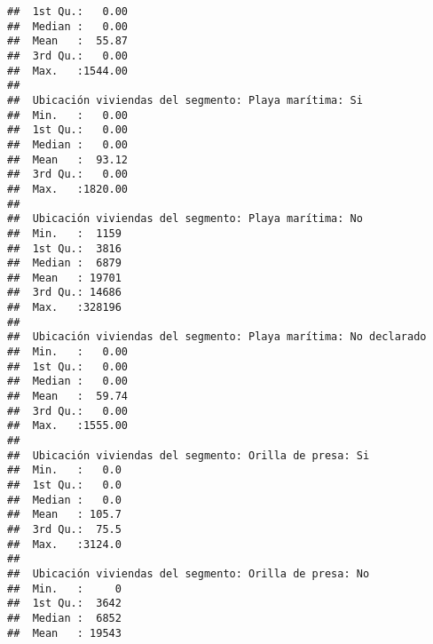 \documentclass[11pt,]{article}
\begin{document}
\begin{verbatim}
##  1st Qu.:   0.00                                               
##  Median :   0.00                                               
##  Mean   :  55.87                                               
##  3rd Qu.:   0.00                                               
##  Max.   :1544.00                                               
##                                                                
##  Ubicación viviendas del segmento: Playa marítima: Si
##  Min.   :   0.00                                     
##  1st Qu.:   0.00                                     
##  Median :   0.00                                     
##  Mean   :  93.12                                     
##  3rd Qu.:   0.00                                     
##  Max.   :1820.00                                     
##                                                      
##  Ubicación viviendas del segmento: Playa marítima: No
##  Min.   :  1159                                      
##  1st Qu.:  3816                                      
##  Median :  6879                                      
##  Mean   : 19701                                      
##  3rd Qu.: 14686                                      
##  Max.   :328196                                      
##                                                      
##  Ubicación viviendas del segmento: Playa marítima: No declarado
##  Min.   :   0.00                                               
##  1st Qu.:   0.00                                               
##  Median :   0.00                                               
##  Mean   :  59.74                                               
##  3rd Qu.:   0.00                                               
##  Max.   :1555.00                                               
##                                                                
##  Ubicación viviendas del segmento: Orilla de presa: Si
##  Min.   :   0.0                                       
##  1st Qu.:   0.0                                       
##  Median :   0.0                                       
##  Mean   : 105.7                                       
##  3rd Qu.:  75.5                                       
##  Max.   :3124.0                                       
##                                                       
##  Ubicación viviendas del segmento: Orilla de presa: No
##  Min.   :     0                                       
##  1st Qu.:  3642                                       
##  Median :  6852                                       
##  Mean   : 19543                                       

\end{verbatim}
\end{document}
